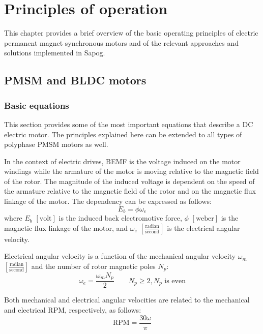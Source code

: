 \documentclass{zubaxdoc}
\begin{document}
\chapter{Principles of operation}

This chapter provides a brief overview of the basic operating principles of electric permanent magnet
synchronous motors and of the relevant approaches and solutions implemented in Sapog.

\section{PMSM and BLDC motors}

\subsection{Basic equations}\label{sec:motor_equations}

This section provides some of the most important equations that describe a DC electric motor.
The principles explained here can be extended to all types of polyphase PMSM motors as well.

In the context of electric drives, BEMF is the voltage induced on the motor windings
while the armature of the motor is moving relative to the magnetic field of the rotor.
The magnitude of the induced voltage is dependent on the speed of the armature relative to the magnetic field
of the rotor and on the magnetic flux linkage of the motor.
The dependency can be expressed as follows:
\begin{equation}
E_b = \phi \omega_e
\end{equation}
where $E_b$ $\left[\text{volt}\right]$ is the induced back electromotive force,
$\phi$ $\left[\text{weber}\right]$ is the magnetic flux linkage of the motor,
and $\omega_e$ $\left[\frac{\text{radian}}{\text{second}}\right]$ is the electrical angular velocity.

Electrical angular velocity is a function of the mechanical angular velocity
$\omega_m$ $\left[\frac{\text{radian}}{\text{second}}\right]$
and the number of rotor magnetic poles $N_p$:
\begin{equation}\label{eq:speed_electrical_mechanical}
\omega_e = \frac{\omega_m N_p}{2}\qquad
N_p \geq 2, N_p\text{\ is even}
\end{equation}

Both mechanical and electrical angular velocities are related to the mechanical and electrical RPM,
respectively, as follows:
\begin{equation}
\text{RPM} = \frac{30 \omega }{\pi }
\end{equation}
\end{document}
